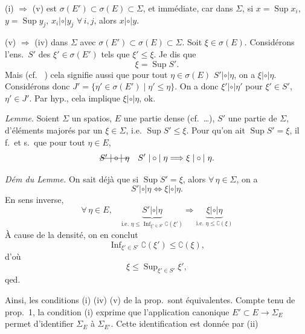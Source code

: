 \documentclass[11pt,a4paper]{article}
\begin{document}
(i) $\Longrightarrow$ (v) est  $\sigma(E') \subset \sigma(E) \subset \Sigma$, et immédiate, car dans $\Sigma$, si $x = \operatorname{Sup} x_i$, $y = \operatorname{Sup} y_j$, $x_i \mathrel{|\circ|} y_j$ $\forall\, i, j$, alors $x \mathrel{|\circ|} y$.

(v) $\Longrightarrow$ (iv)   dans $\Sigma$ avec $\sigma(E') \subset \sigma(E) \subset \Sigma$. Soit $\xi \in \sigma(E)$.  Considérons  l'ens.\ $S'$ des $\xi' \in \sigma(E')$ tels que $\xi' \leq \xi$. Je dis que
\[
  \xi = \operatorname{Sup} S' .
\]
\struck{\ill{}} Mais (cf.\  ) cela signifie aussi que pour tout $\eta \in \sigma(E)$  $S' \mathrel{|\circ|} \eta$, on a $\xi \mathrel{|\circ|} \eta$. Considérons donc $J' = \{\eta' \in \sigma(E') \mid \eta' \leq \eta\}$. On a donc $\xi' \mathrel{|\circ|} \eta'$ pour $\xi' \in S'$, $\eta' \in J'$. Par hyp., cela implique $\xi \mathrel{|\circ|} \eta$, ok.


\emph{Lemme.} Soient $\Sigma$ un spatios, $E$ une partie dense (cf.~\ldots), $S'$ une partie de $\Sigma$,  d'éléments majorés par un $\xi \in \Sigma$,  i.e. $\operatorname{Sup} S' \leq \xi$. Pour qu'on ait $\operatorname{Sup} S' = \xi$, il f.\ et s.\ que pour tout $\eta \in E$, 
\[
  \text{\struck{$S' \mathrel{|\circ|} \eta$}} \quad S' \mathrel{|\circ|} \eta \Longrightarrow \xi \mathrel{|\circ|} \eta .
\]

\emph{Dém du Lemme.} On sait déjà que si $\operatorname{Sup} S' = \xi$, alors $\forall\, \eta \in \Sigma$, on a
\[
  S' \mathrel{|\circ|} \eta \iff \xi \mathrel{|\circ|} \eta .
\]
En sens inverse,  \struck{$\complement\xi \geq \ldots$}
\[
  \forall\, \eta \in E, \quad
  \underbrace{S' \mathrel{|\circ|} \eta}_{\text{i.e. } \eta \leq \operatorname{Inf}_{\xi' \in S'} \complement(\xi')}
  \Longrightarrow
  \underbrace{\xi \mathrel{|\circ|} \eta}_{\text{i.e. } \eta \leq \complement(\xi)}
\]
À cause de la densité, on en conclut
\[
  \operatorname{Inf}_{\xi' \in S'} \complement(\xi') \leq \complement(\xi) ,
\]
d'où
\[
  \xi \leq \operatorname{Sup}_{\xi' \in S'} \xi' ,
\]
qed.

Ainsi, les conditions (i) (iv) (v) de la prop.\ sont équivalentes. Compte tenu de prop.~1, la condition (i) exprime que l'application canonique $E' \subset E \to \Sigma_E$ permet d'identifier $\Sigma_E$ à $\Sigma_{E'}$. Cette identification est  donnée par (ii)
\end{document}
